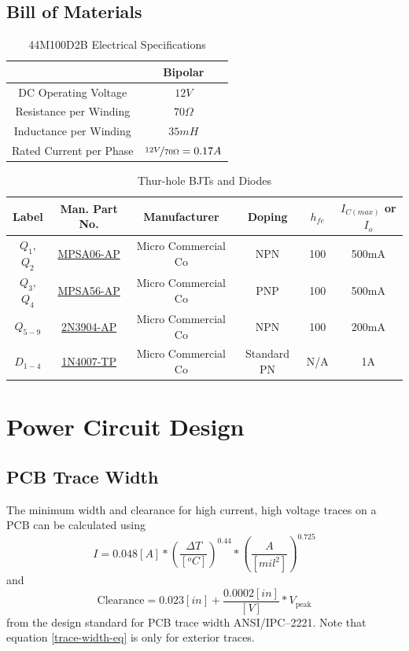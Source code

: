 \documentclass[10pt, twocolumn]{article}
\begin{document}
\subsection{Bill of Materials}

\begin{table}
\centering
\caption{44M100D2B Electrical Specifications}
\begin{tabular}{c | c }
\hline\hline
&Bipolar	\\
\hline\hline
DC Operating Voltage	&$12V$	\\
Resistance per Winding	&$70\Omega$	\\
Inductance per Winding	&$35mH$	\\
Rated Current per Phase	&$\nicefrac{12V}{70\Omega}=0.17A$	\\
\hline\hline
\end{tabular}
\end{table}

\begin{table}[ht]
\centering
\caption{Thur-hole BJTs and Diodes}
\begin{tabular}{c c c c c c}
\hline\hline
Label	&Man. Part No.	&Manufacturer	&Doping	&$h_{fe}$	&$I_{C(max)}$ or $I_{o}$	\\
\hline\hline
$Q_{1}$, $Q_{2}$	&\href{datasheets/MPSA06(TO-92).pdf}{MPSA06-AP}	&Micro Commercial Co	&NPN	&100	&500mA	\\
$Q_{3}$, $Q_{4}$	&\href{datasheets/MPSA55-MPSA56(TO-92).pdf}{MPSA56-AP}	&Micro Commercial Co	&PNP	&100	&500mA	\\
$Q_{5-9}$	&\href{datasheets/2N3904(TO-92).pdf}{2N3904-AP}	&Micro Commercial Co	&NPN	&100	&200mA	\\
$D_{1-4}$	&\href{datasheets/1N4001-1N4007(DO-41).pdf}{1N4007-TP}	&Micro Commercial Co	&Standard PN	&N/A	&1A	\\
\hline\hline
\end{tabular}
\end{table}

\section{Power Circuit Design}

\subsection{PCB Trace Width}

The minimum width and clearance for high current, high voltage traces
on a PCB can be calculated using
\begin{equation}
I=0.048[A]*\left(\frac{\Delta T}{[^{o}C]}\right)^{0.44}*\left(\frac{A}{[mil^{2}]}\right)^{0.725}
\label{trace-width-eq}
\end{equation}
and
\begin{equation}
\textrm{Clearance}=0.023[in]+\frac{0.0002[in]}{[V]}*V_{\textrm{peak}}
\end{equation}
from the design standard for PCB trace width ANSI/IPC--2221. Note that
equation \ref{trace-width-eq} is only for exterior traces.
\end{document}
